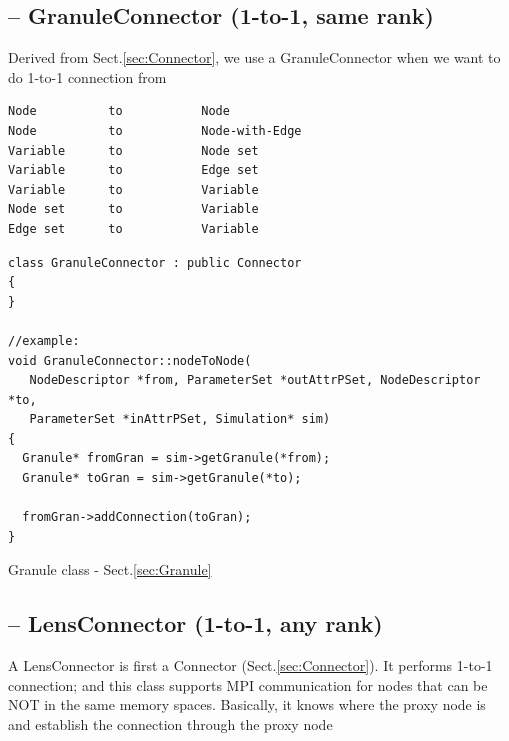 \subsection{-- GranuleConnector (1-to-1, same rank)}
\label{sec:GranuleConnector}

Derived from Sect.\ref{sec:Connector}, we use a GranuleConnector when we want to
do 1-to-1 connection from 
\begin{verbatim}
Node          to           Node
Node          to           Node-with-Edge
Variable      to           Node set
Variable      to           Edge set
Variable      to           Variable
Node set      to           Variable
Edge set      to           Variable
\end{verbatim} 

\begin{verbatim}
class GranuleConnector : public Connector
{
}

//example:
void GranuleConnector::nodeToNode(
   NodeDescriptor *from, ParameterSet *outAttrPSet, NodeDescriptor *to, 
   ParameterSet *inAttrPSet, Simulation* sim)
{
  Granule* fromGran = sim->getGranule(*from);
  Granule* toGran = sim->getGranule(*to);

  fromGran->addConnection(toGran);
}
\end{verbatim}
Granule class - Sect.\ref{sec:Granule}

\subsection{-- LensConnector (1-to-1, any rank)}
\label{sec:LensConnector}

A LensConnector is first a Connector (Sect.\ref{sec:Connector}).
It performs 1-to-1 connection; and this class supports MPI communication for
nodes that can be NOT in the same memory spaces. Basically, it knows where the
proxy node is and establish the connection through the proxy node

